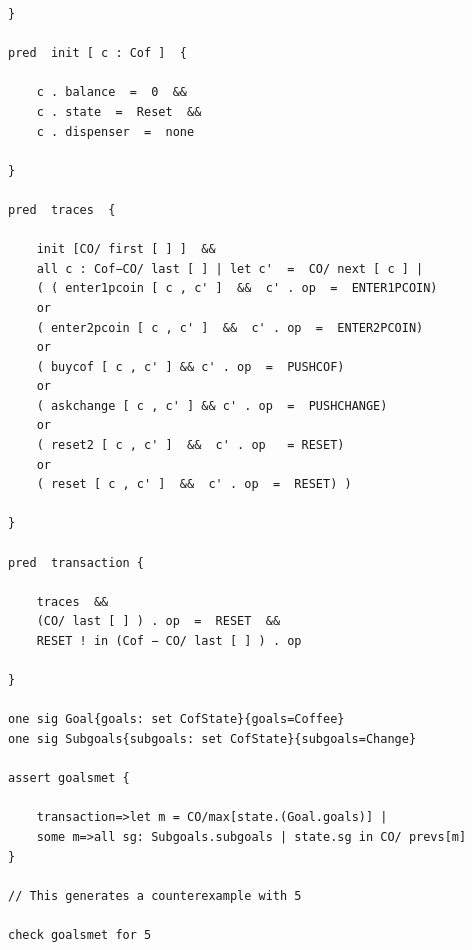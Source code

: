 \documentclass[a4paper,10pt]{report}
\begin{document}
\begin{verbatim}
}

pred  init [ c : Cof ]  {

	c . balance  =  0  &&
	c . state  =  Reset  &&
	c . dispenser  =  none

}

pred  traces  {

	init [CO/ first [ ] ]  &&
	all c : Cof−CO/ last [ ] | let c'  =  CO/ next [ c ] |
	( ( enter1pcoin [ c , c' ]  &&  c' . op  =  ENTER1PCOIN)
	or
	( enter2pcoin [ c , c' ]  &&  c' . op  =  ENTER2PCOIN)
	or
	( buycof [ c , c' ] && c' . op  =  PUSHCOF)
	or
	( askchange [ c , c' ] && c' . op  =  PUSHCHANGE)
	or
	( reset2 [ c , c' ]  &&  c' . op   = RESET)
	or
	( reset [ c , c' ]  &&  c' . op  =  RESET) )

}

pred  transaction {

	traces  &&
	(CO/ last [ ] ) . op  =  RESET  &&
	RESET ! in (Cof − CO/ last [ ] ) . op

}

one sig Goal{goals: set CofState}{goals=Coffee}
one sig Subgoals{subgoals: set CofState}{subgoals=Change}

assert goalsmet {

	transaction=>let m = CO/max[state.(Goal.goals)] |
	some m=>all sg: Subgoals.subgoals | state.sg in CO/ prevs[m]
}

// This generates a counterexample with 5

check goalsmet for 5
\end{verbatim}
\end{document}
